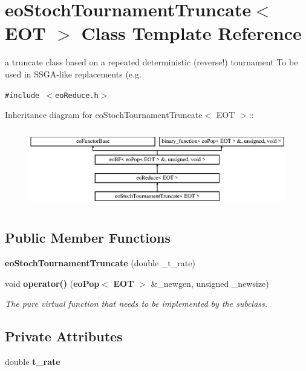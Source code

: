 \section{eo\-Stoch\-Tournament\-Truncate$<$ EOT $>$ Class Template Reference}
\label{classeo_stoch_tournament_truncate}
a truncate class based on a repeated deterministic (reverse!) tournament To be used in SSGA-like replacements (e.g.  


{\tt \#include $<$eo\-Reduce.h$>$}

Inheritance diagram for eo\-Stoch\-Tournament\-Truncate$<$ EOT $>$::\begin{figure}[H]
\begin{center}
\leavevmode
\includegraphics[height=3.45679cm]{classeo_stoch_tournament_truncate}
\end{center}
\end{figure}
\subsection*{Public Member Functions}
\begin{CompactItemize}
\item 
{\bf eo\-Stoch\-Tournament\-Truncate} (double \_\-t\_\-rate)\label{classeo_stoch_tournament_truncate_a0}

\item 
void {\bf operator()} ({\bf eo\-Pop}$<$ {\bf EOT} $>$ \&\_\-newgen, unsigned \_\-newsize)\label{classeo_stoch_tournament_truncate_a1}

\begin{CompactList}\small\item\em The pure virtual function that needs to be implemented by the subclass. \item\end{CompactList}\end{CompactItemize}
\subsection*{Private Attributes}
\begin{CompactItemize}
\item 
double {\bf t\_\-rate}\label{classeo_stoch_tournament_truncate_r0}

\end{CompactItemize}


